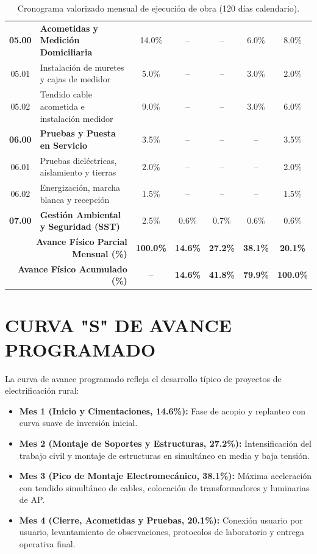 \begin{table}[H]
\begin{tabular}{|c|l|c|c|c|c|c|}
\hline
\textbf{05.00} & \textbf{Acometidas y Medición Domiciliaria} & 14.0\% & -- & -- & 6.0\% & 8.0\% \\
05.01 & Instalación de muretes y cajas de medidor & 5.0\% & -- & -- & 3.0\% & 2.0\% \\
05.02 & Tendido cable acometida e instalación medidor & 9.0\% & -- & -- & 3.0\% & 6.0\% \\
\hline
\textbf{06.00} & \textbf{Pruebas y Puesta en Servicio} & 3.5\% & -- & -- & -- & 3.5\% \\
06.01 & Pruebas dieléctricas, aislamiento y tierras & 2.0\% & -- & -- & -- & 2.0\% \\
06.02 & Energización, marcha blanca y recepción & 1.5\% & -- & -- & -- & 1.5\% \\
\hline
\textbf{07.00} & \textbf{Gestión Ambiental y Seguridad (SST)} & 2.5\% & 0.6\% & 0.7\% & 0.6\% & 0.6\% \\
\hline
\hline
\multicolumn{2}{|r|}{\textbf{Avance Físico Parcial Mensual (\%)}} & \textbf{100.0\%} & \textbf{14.6\%} & \textbf{27.2\%} & \textbf{38.1\%} & \textbf{20.1\%} \\
\multicolumn{2}{|r|}{\textbf{Avance Físico Acumulado (\%)}} & -- & \textbf{14.6\%} & \textbf{41.8\%} & \textbf{79.9\%} & \textbf{100.0\%} \\
\hline
\end{tabular}
\caption{Cronograma valorizado mensual de ejecución de obra (120 días calendario).}
\end{table}

\section{CURVA "S" DE AVANCE PROGRAMADO}

La curva de avance programado refleja el desarrollo típico de proyectos de electrificación rural:
\begin{itemize}
  \item \textbf{Mes 1 (Inicio y Cimentaciones, 14.6\%):} Fase de acopio y replanteo con curva suave de inversión inicial.
  \item \textbf{Mes 2 (Montaje de Soportes y Estructuras, 27.2\%):} Intensificación del trabajo civil y montaje de estructuras en simultáneo en media y baja tensión.
  \item \textbf{Mes 3 (Pico de Montaje Electromecánico, 38.1\%):} Máxima aceleración con tendido simultáneo de cables, colocación de transformadores y luminarias de AP.
  \item \textbf{Mes 4 (Cierre, Acometidas y Pruebas, 20.1\%):} Conexión usuario por usuario, levantamiento de observaciones, protocolos de laboratorio y entrega operativa final.
\end{itemize}
